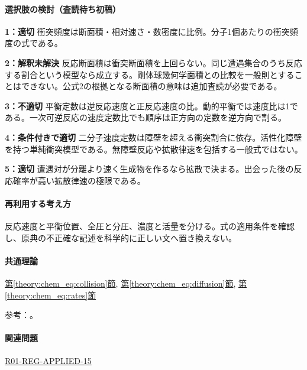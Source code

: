 \paragraph{選択肢の検討（査読待ち初稿）}\mbox{}\par

\noindent\textbf{1：適切} 衝突頻度は断面積・相対速さ・数密度に比例。分子1個あたりの衝突頻度の式である。\par

\noindent\textbf{2：解釈未解決} 反応断面積は衝突断面積を上回らない。同じ遭遇集合のうち反応する割合という模型なら成立する。剛体球幾何学面積との比較を一般則とすることはできない。公式2の根拠となる断面積の意味は追加査読が必要である。\par

\noindent\textbf{3：不適切} 平衡定数は逆反応速度と正反応速度の比。動的平衡では速度比は1である。一次可逆反応の速度定数比でも順序は正方向の定数を逆方向で割る。\par

\noindent\textbf{4：条件付きで適切} 二分子速度定数は障壁を超える衝突割合に依存。活性化障壁を持つ単純衝突模型である。無障壁反応や拡散律速を包括する一般式ではない。\par

\noindent\textbf{5：適切} 遭遇対が分離より速く生成物を作るなら拡散で決まる。出会った後の反応確率が高い拡散律速の極限である。\par

\paragraph{再利用する考え方} 反応速度と平衡位置、全圧と分圧、濃度と活量を分ける。式の適用条件を確認し、原典の不正確な記述を科学的に正しい文へ置き換えない。

\paragraph{共通理論} \hyperref[theory:chem_eq:collision]{第\ref*{theory:chem_eq:collision}節}, \hyperref[theory:chem_eq:diffusion]{第\ref*{theory:chem_eq:diffusion}節}, \hyperref[theory:chem_eq:rates]{第\ref*{theory:chem_eq:rates}節}

\par 参考：\cite{iupac_greenbook2012}。

\paragraph{関連問題} \hyperref[q:r01-reg-applied-15]{R01-REG-APPLIED-15}


